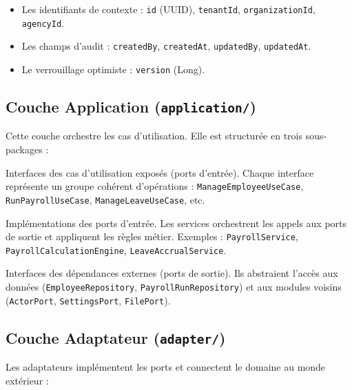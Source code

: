 \documentclass[a4paper,12pt,openany]{book}
\begin{document}
    \begin{itemize}
        \item Les identifiants de contexte : \texttt{id} (UUID), \texttt{tenantId}, \texttt{organizationId}, \texttt{agencyId}.
        \item Les champs d'audit : \texttt{createdBy}, \texttt{createdAt}, \texttt{updatedBy}, \texttt{updatedAt}.
        \item Le verrouillage optimiste : \texttt{version} (Long).
    \end{itemize}

    \subsection{Couche Application (\texttt{application/})}

    Cette couche orchestre les cas d'utilisation. Elle est structurée en trois sous-packages :

    \begin{description}[style=nextline]
  \item[\texttt{port/in/}] Interfaces des cas d'utilisation exposés (ports d'entrée). Chaque interface représente un groupe cohérent d'opérations : \texttt{ManageEmployeeUseCase}, \texttt{RunPayrollUseCase}, \texttt{ManageLeaveUseCase}, etc.
  \item[\texttt{service/}] Implémentations des ports d'entrée. Les services orchestrent les appels aux ports de sortie et appliquent les règles métier. Exemples : \texttt{PayrollService}, \texttt{PayrollCalculationEngine}, \texttt{LeaveAccrualService}.
  \item[\texttt{port/out/}] Interfaces des dépendances externes (ports de sortie). Ils abstraient l'accès aux données (\texttt{EmployeeRepository}, \texttt{PayrollRunRepository}) et aux modules voisins (\texttt{ActorPort}, \texttt{SettingsPort}, \texttt{FilePort}).
    \end{description}

    \subsection{Couche Adaptateur (\texttt{adapter/})}

    Les adaptateurs implémentent les ports et connectent le domaine au monde extérieur :
\end{document}
